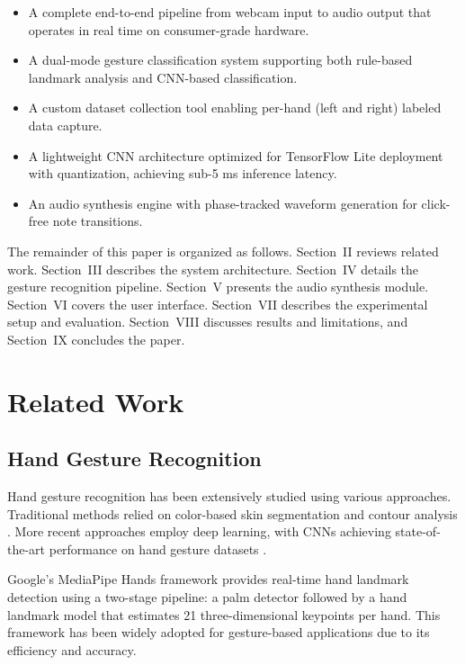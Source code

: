 \documentclass[conference]{IEEEtran}
\begin{document}
\begin{itemize}
\item A complete end-to-end pipeline from webcam input to audio output that operates in real time on consumer-grade hardware.
\item A dual-mode gesture classification system supporting both rule-based landmark analysis and CNN-based classification.
\item A custom dataset collection tool enabling per-hand (left and right) labeled data capture.
\item A lightweight CNN architecture optimized for TensorFlow Lite deployment with quantization, achieving sub-5 ms inference latency.
\item An audio synthesis engine with phase-tracked waveform generation for click-free note transitions.
\end{itemize}

The remainder of this paper is organized as follows. Section~II reviews related work. Section~III describes the system architecture. Section~IV details the gesture recognition pipeline. Section~V presents the audio synthesis module. Section~VI covers the user interface. Section~VII describes the experimental setup and evaluation. Section~VIII discusses results and limitations, and Section~IX concludes the paper.

\section{Related Work}

\subsection{Hand Gesture Recognition}

Hand gesture recognition has been extensively studied using various approaches. Traditional methods relied on color-based skin segmentation and contour analysis \cite{pisharady2015recent}. More recent approaches employ deep learning, with CNNs achieving state-of-the-art performance on hand gesture datasets \cite{molchanov2015hand}.

Google's MediaPipe Hands framework \cite{zhang2020mediapipe} provides real-time hand landmark detection using a two-stage pipeline: a palm detector followed by a hand landmark model that estimates 21 three-dimensional keypoints per hand. This framework has been widely adopted for gesture-based applications due to its efficiency and accuracy.
\end{document}
